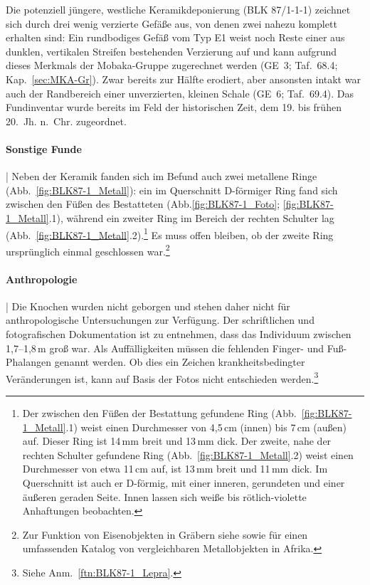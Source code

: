 Die potenziell jüngere, westliche Keramikdeponierung (BLK 87/1-1-1) zeichnet sich durch drei wenig verzierte Gefäße aus, von denen zwei nahezu komplett erhalten sind: Ein rundbodiges Gefäß vom Typ E1 weist noch Reste einer aus dunklen, vertikalen Streifen bestehenden Verzierung auf und kann aufgrund dieses Merkmals der Mobaka-Gruppe zugerechnet werden (GE~3; Taf.~68.4; Kap.~\ref{sec:MKA-Gr}). Zwar bereits zur Hälfte erodiert, aber ansonsten intakt war auch der Randbereich einer unverzierten, kleinen Schale (GE~6; Taf.~69.4). Das Fundinventar wurde bereits im Feld der historischen Zeit, dem 19. bis frühen 20.~Jh. n.~Chr. zugeordnet. 

\paragraph{Sonstige Funde}\hspace{-.5em}|\hspace{.5em}%
Neben der Keramik fanden sich im Befund auch zwei metallene Ringe (Abb.~\ref{fig:BLK87-1_Metall}): ein im Querschnitt D-förmiger Ring fand sich zwischen den Füßen des Bestatteten (Abb.\ref{fig:BLK87-1_Foto}; \ref{fig:BLK87-1_Metall}.1), während ein zweiter Ring im Bereich der rechten Schulter lag (Abb.~\ref{fig:BLK87-1_Metall}.2).\footnote{Der zwischen den Füßen der Bestattung gefundene Ring (Abb.~\ref{fig:BLK87-1_Metall}.1) weist einen Durchmesser von 4,5\,cm (innen) bis 7\,cm (außen) auf. Dieser Ring ist 14\,mm breit und 13\,mm dick. Der zweite, nahe der rechten Schulter gefundene Ring (Abb.~\ref{fig:BLK87-1_Metall}.2) weist einen Durchmesser von etwa 11\,cm auf, ist 13\,mm breit und 11\,mm dick. Im Querschnitt ist auch er D-förmig, mit einer inneren, gerundeten und einer äußeren geraden Seite. Innen lassen sich weiße bis rötlich-violette Anhaftungen beobachten.} Es muss offen bleiben, ob der zweite Ring ursprünglich einmal geschlossen war.\footnote{Zur Funktion von Eisenobjekten in Gräbern siehe \textcites{GonzalezRuibal.2011}[124--126]{Eggert.2016} sowie \textcite[siehe][]{Ballarini.2009} für einen umfassenden Katalog von vergleichbaren Metallobjekten in Afrika.}

\paragraph{Anthropologie}\hspace{-.5em}|\hspace{.5em}%
Die Knochen wurden nicht geborgen und stehen daher nicht für anthropologische Untersuchungen zur Verfügung. Der schriftlichen und fotografischen Dokumentation ist zu entnehmen, dass das Individuum zwischen 1,7--1,8\,m groß war. Als Auffälligkeiten müssen die fehlenden Finger- und Fuß-Phalangen genannt werden. Ob dies ein Zeichen krankheitsbedingter Veränderungen ist, kann auf Basis der Fotos nicht entschieden werden.\footnote{Siehe Anm.~\ref{ftn:BLK87-1_Lepra}.}

